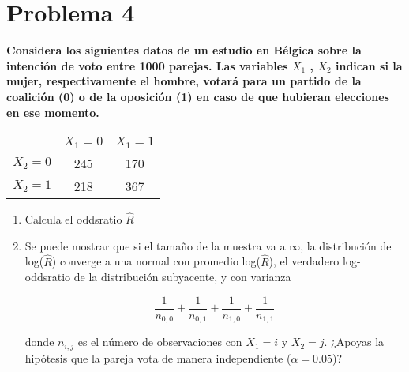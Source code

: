 \section*{Problema 4}

\textbf{Considera los siguientes datos de un estudio en Bélgica sobre la intención de voto entre 1000 parejas. Las variables $X_1$ , $X_2$ indican si la mujer, respectivamente el hombre, votará para un partido de la coalición (0) o de la oposición (1) en caso de que hubieran elecciones en ese momento.}

\begin{table}[H]
	\centering
	\begin{tabular}{c|cc}
		        & $X_1=0$ & $X_1=1$ \\  \hline
		$X_2=0$ & 245     & 170     \\
		$X_2=1$ & 218     & 367
	\end{tabular}
\end{table}

\begin{enumerate}
	\item Calcula el oddsratio $\hat{R}$
	\item Se puede mostrar que si el tamaño de la muestra va a $\infty$, la distribución de log($\hat{R}$) converge a una normal con promedio log($\hat{R}$), el verdadero log-oddsratio de la distribución subyacente, y con varianza

	      \begin{equation*}
		      \frac{1}{n_{0,0}} + \frac{1}{n_{0,1}} + \frac{1}{n_{1,0}} + \frac{1}{n_{1,1}}
	      \end{equation*}

	      donde $n_{i,j}$ es el número de  observaciones con $X_1=i$ y $X_2=j$. ¿Apoyas la hipótesis que la pareja vota de manera independiente ($\alpha=0.05$)?
\end{enumerate}
